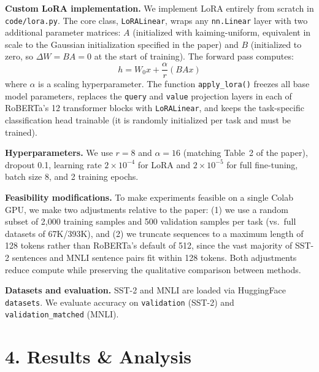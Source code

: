 \documentclass[11pt]{article}
\begin{document}
\textbf{Custom LoRA implementation.}
We implement LoRA entirely from scratch in \texttt{code/lora.py}. The core
class, \texttt{LoRALinear}, wraps any \texttt{nn.Linear} layer with two
additional parameter matrices: $A$ (initialized with kaiming-uniform, equivalent
in scale to the Gaussian initialization specified in the paper) and $B$
(initialized to zero, so $\Delta W = BA = 0$ at the start of training). The
forward pass computes:
\[
  h = W_0 x + \frac{\alpha}{r}(BAx)
\]
where $\alpha$ is a scaling hyperparameter. The function \texttt{apply\_lora()}
freezes all base model parameters, replaces the \texttt{query} and \texttt{value}
projection layers in each of RoBERTa's 12 transformer blocks with
\texttt{LoRALinear}, and keeps the task-specific classification head trainable
(it is randomly initialized per task and must be trained).

\textbf{Hyperparameters.}
We use $r=8$ and $\alpha=16$ (matching Table~2 of the paper), dropout 0.1,
learning rate $2 \times 10^{-4}$ for LoRA and $2 \times 10^{-5}$ for full
fine-tuning, batch size 8, and 2 training epochs.

\textbf{Feasibility modifications.}
To make experiments feasible on a single Colab GPU, we make two adjustments
relative to the paper: (1) we use a random subset of 2,000 training samples
and 500 validation samples per task (vs.\ full datasets of 67K/393K), and (2)
we truncate sequences to a maximum length of 128 tokens rather than RoBERTa's
default of 512, since the vast majority of SST-2 sentences and MNLI sentence
pairs fit within 128 tokens. Both adjustments reduce compute while preserving
the qualitative comparison between methods.

\textbf{Datasets and evaluation.}
SST-2 and MNLI are loaded via HuggingFace \texttt{datasets}. We evaluate
accuracy on \texttt{validation} (SST-2) and \texttt{validation\_matched} (MNLI).

\section*{4. Results \& Analysis}

\end{document}
